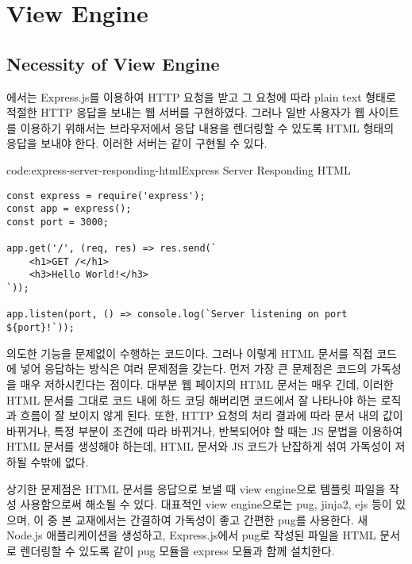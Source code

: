 \section{View Engine}\label{sect:view-engine}

\subsection*{Necessity of View Engine}

에서는 Express.js를 이용하여 HTTP 요청을 받고 그 요청에 따라 plain text 형태로 적절한 HTTP 응답을 보내는 웹 서버를 구현하였다. 그러나 일반 사용자가 웹 사이트를 이용하기 위해서는 브라우저에서 응답 내용을 렌더링할 수 있도록 HTML 형태의 응답을 보내야 한다. 이러한 서버는 \과 같이 구현될 수 있다.

\begin{code}{code:express-server-responding-html}{Express Server Responding HTML}
\begin{verbatim}
const express = require('express');
const app = express();
const port = 3000;

app.get('/', (req, res) => res.send(`
    <h1>GET /</h1>
    <h3>Hello World!</h3>
`));

app.listen(port, () => console.log(`Server listening on port ${port}!`));
\end{verbatim}
\end{code}

\은 의도한 기능을 문제없이 수행하는 코드이다. 그러나 이렇게 HTML 문서를 직접 코드에 넣어 응답하는 방식은 여러 문제점을 갖는다. 먼저 가장 큰 문제점은 코드의 가독성을 매우 저하시킨다는 점이다. 대부분 웹 페이지의 HTML 문서는 매우 긴데, 이러한 HTML 문서를 그대로 코드 내에 하드 코딩 해버리면 코드에서 잘 나타나야 하는 로직과 흐름이 잘 보이지 않게 된다. 또한, HTTP 요청의 처리 결과에 따라 문서 내의 값이 바뀌거나, 특정 부분이 조건에 따라 바뀌거나, 반복되어야 할 때는 JS 문법을 이용하여 HTML 문서를 생성해야 하는데, HTML 문서와 JS 코드가 난잡하게 섞여 가독성이 저하될 수밖에 없다.

상기한 문제점은 HTML 문서를 응답으로 보낼 때 view engine으로 템플릿 파일을 작성 사용함으로써 해소될 수 있다. 대표적인 view engine으로는 pug, jinja2, ejs 등이 있으며, 이 중 본 교재에서는 간결하여 가독성이 좋고 간편한 pug를 사용한다. 새 Node.js 애플리케이션을 생성하고, Express.js에서 pug로 작성된 파일을 HTML 문서로 렌더링할 수 있도록 \와 같이 pug 모듈을 express 모듈과 함께 설치한다.

